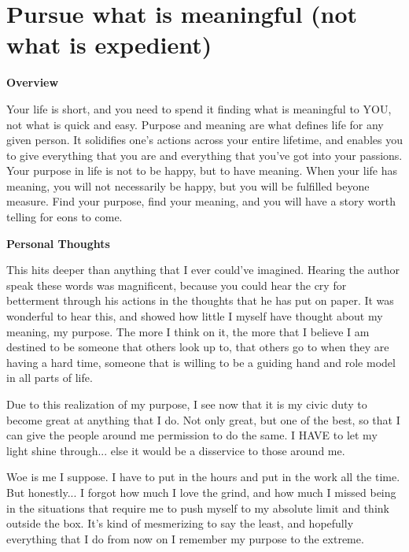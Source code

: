 \documentclass{article}
\begin{document}
\section{Pursue what is meaningful (not what is expedient)}
        \begin{multicols}{2}
        \begin{center}
            \textbf{Overview}
        \end{center}
        
        Your life is short, and you need to spend it finding what is meaningful to YOU, not what is quick and easy. Purpose and meaning are what defines life for any given person. It solidifies one's actions across your entire lifetime, and enables you to give everything that you are and everything that you've got into your passions. Your purpose in life is not to be happy, but to have meaning. When your life has meaning, you will not necessarily be happy, but you will be fulfilled beyone measure. Find your purpose, find your meaning, and you will have a story worth telling for eons to come.  

        \begin{center}
            \textbf{Personal Thoughts}
        \end{center}
        
        This hits deeper than anything that I ever could've imagined. Hearing the author speak these words was magnificent, because you could hear the cry for betterment through his actions in the thoughts that he has put on paper. It was wonderful to hear this, and showed how little I myself have thought about my meaning, my purpose. The more I think on it, the more that I believe I am destined to be someone that others look up to, that others go to when they are having a hard time, someone that is willing to be a guiding hand and role model in all parts of life.

        Due to this realization of my purpose, I see now that it is my civic duty to become great at anything that I do. Not only great, but one of the best, so that I can give the people around me permission to do the same. I HAVE to let my light shine through... else it would be a disservice to those around me.

        Woe is me I suppose. I have to put in the hours and put in the work all the time. But honestly... I forgot how much I love the grind, and how much I missed being in the situations that require me to push myself to my absolute limit and think outside the box. It's kind of mesmerizing to say the least, and hopefully everything that I do from now on I remember my purpose to the extreme.
    \end{multicols}
    
\end{document}
